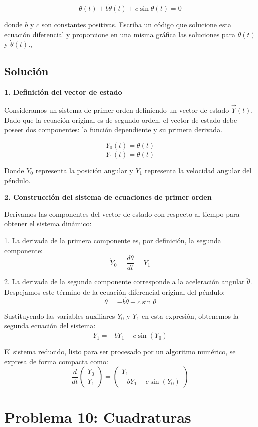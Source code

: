 \documentclass[12pt, letterpaper]{article}
\begin{document}
$$ \ddot{\theta}(t) + b\dot{\theta}(t) + c \sin \theta(t) = 0 $$

donde $b$ y $c$ son constantes positivas. Escriba un código que solucione esta ecuación diferencial y proporcione en una misma gráfica las soluciones para $\theta(t)$ y $\dot{\theta}(t)$.,

\subsection{Solución}


\textbf{1. Definición del vector de estado}

Consideramos un sistema de primer orden definiendo un vector de estado $\vec{Y}(t)$. Dado que la ecuación original es de segundo orden, el vector de estado debe poseer dos componentes: la función dependiente y su primera derivada.

$$ Y_0(t) = \theta(t) $$
$$ Y_1(t) = \dot{\theta}(t) $$

Donde $Y_0$ representa la posición angular y $Y_1$ representa la velocidad angular del péndulo.

\textbf{2. Construcción del sistema de ecuaciones de primer orden}

Derivamos las componentes del vector de estado con respecto al tiempo para obtener el sistema dinámico:

1. La derivada de la primera componente es, por definición, la segunda componente:
$$ \dot{Y}_0 = \frac{d\theta}{dt} = Y_1 $$

2. La derivada de la segunda componente corresponde a la aceleración angular $\ddot{\theta}$. Despejamos este término de la ecuación diferencial original del péndulo:
$$ \ddot{\theta} = -b\dot{\theta} - c \sin \theta $$

Sustituyendo las variables auxiliares $Y_0$ y $Y_1$ en esta expresión, obtenemos la segunda ecuación del sistema:
$$ \dot{Y}_1 = -b Y_1 - c \sin(Y_0) $$

El sistema reducido, listo para ser procesado por un algoritmo numérico, se expresa de forma compacta como:
$$ \frac{d}{dt} \begin{pmatrix} Y_0 \\ Y_1 \end{pmatrix} = \begin{pmatrix} Y_1 \\ -b Y_1 - c \sin(Y_0) \end{pmatrix} $$


\section{Problema 10: Cuadraturas}
\end{document}
